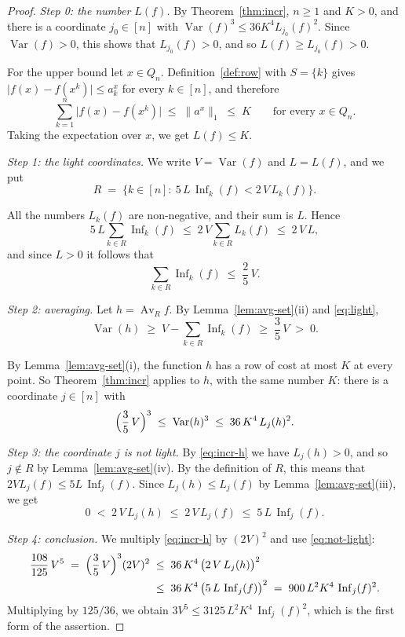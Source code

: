 \documentclass[11pt,reqno]{amsart}
\theoremstyle{definition}
\theoremstyle{remark}
\numberwithin{equation}{section}
\theoremstyle{named}
\theoremstyle{plain}
\newcommand{\Var}{\operatorname{Var}}
\newcommand{\Inf}{\operatorname{Inf}}
\newcommand{\Av}{\operatorname{Av}}
\newcommand{\norm}[1]{\lVert #1\rVert_1}
\newcommand{\abs}[1]{\lvert #1\rvert}
\begin{document}
\begin{proof}
\emph{Step 0: the number $L(f)$.} By Theorem~\ref{thm:incr}, $n\ge1$ and $K>0$, and there is a
coordinate $j_0\in[n]$ with $\Var(f)^{3}\le36K^{4}L_{j_0}(f)^{2}$. Since $\Var(f)>0$, this shows
that $L_{j_0}(f)>0$, and so $L(f)\ge L_{j_0}(f)>0$.

For the upper bound let $x\in Q_n$. Definition~\ref{def:row} with $S=\{k\}$ gives
$\abs{f(x)-f(x^{k})}\le a^{x}_k$ for every $k\in[n]$, and therefore
\[
   \sum_{k=1}^{n}\abs{f(x)-f(x^{k})}\;\le\;\norm{a^{x}}\;\le\;K\qquad\text{for every }x\in Q_n .
\]
Taking the expectation over $x$, we get $L(f)\le K$.

\smallskip
\emph{Step 1: the light coordinates.} We write $V=\Var(f)$ and $L=L(f)$, and we put
\[
   R\;=\;\bigl\{k\in[n]:\ 5\,L\,\Inf_k(f)<2\,V\,L_k(f)\bigr\}.
\]

All the numbers $L_k(f)$ are non-negative, and their sum is $L$. Hence
\[
   5\,L\sum_{k\in R}\Inf_k(f)\;\le\;2\,V\sum_{k\in R}L_k(f)\;\le\;2\,V\,L ,
\]
and since $L>0$ it follows that
\begin{equation}\label{eq:light}
   \sum_{k\in R}\Inf_k(f)\;\le\;\frac25\,V .
\end{equation}

\smallskip
\emph{Step 2: averaging.} Let $h=\Av_Rf$. By Lemma~\ref{lem:avg-set}(ii) and \eqref{eq:light},
\[
   \Var(h)\;\ge\;V-\sum_{k\in R}\Inf_k(f)\;\ge\;\frac35\,V\;>\;0 .
\]

By Lemma~\ref{lem:avg-set}(i), the function $h$ has a row of cost at most $K$ at every point. So
Theorem~\ref{thm:incr} applies to $h$, with the same number $K$: there is a coordinate $j\in[n]$
with
\begin{equation}\label{eq:incr-h}
   \Bigl(\frac35\,V\Bigr)^{3}\;\le\;\Var(h)^{3}\;\le\;36\,K^{4}\,L_j(h)^{2}.
\end{equation}

\smallskip
\emph{Step 3: the coordinate $j$ is not light.} By \eqref{eq:incr-h} we have $L_j(h)>0$, and so
$j\notin R$ by Lemma~\ref{lem:avg-set}(iv). By the definition of $R$, this means that
$2VL_j(f)\le5L\,\Inf_j(f)$. Since $L_j(h)\le L_j(f)$ by Lemma~\ref{lem:avg-set}(iii), we get
\begin{equation}\label{eq:not-light}
   0\;<\;2\,V\,L_j(h)\;\le\;2\,V\,L_j(f)\;\le\;5\,L\,\Inf_j(f).
\end{equation}

\smallskip
\emph{Step 4: conclusion.} We multiply \eqref{eq:incr-h} by $(2V)^{2}$ and use
\eqref{eq:not-light}:
\begin{align*}
   \frac{108}{125}\,V^{5}\;=\;\Bigl(\frac35\,V\Bigr)^{3}(2V)^{2}
   &\;\le\;36\,K^{4}\,\bigl(2\,V\,L_j(h)\bigr)^{2}\\
   &\;\le\;36\,K^{4}\,\bigl(5\,L\,\Inf_j(f)\bigr)^{2}\;=\;900\,L^{2}K^{4}\,\Inf_j(f)^{2}.
\end{align*}
Multiplying by $125/36$, we obtain $3V^{5}\le3125\,L^{2}K^{4}\,\Inf_j(f)^{2}$, which is the first
form of the assertion.


\end{proof}
\end{document}
